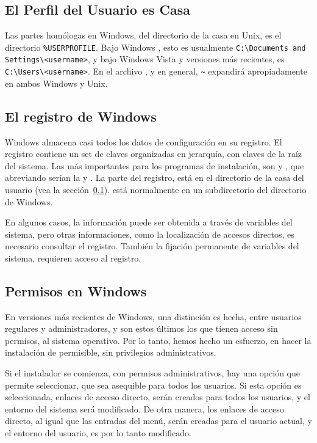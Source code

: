 \documentclass{article}
\begin{document}
\subsection{El Perfil del Usuario es Casa}
\label{sec:winhome}

Las partes homólogas en Windows, del directorio de la casa en Unix, es el
directorio \verb|%USERPROFILE|. Bajo Windows , esto es usualmente
\verb|C:\Documents and Settings\<username>|, y bajo Windows Vista y
versiones más recientes, es \verb|C:\Users\<username>|. En el archivo
, y \KPS{} en general, \verb|~| expandirá
apropiadamente en ambos Windows y Unix. 

\subsection{El registro de Windows}
\label{sec:registry}

Windows almacena casi todos los datos de configuración en su registro. El
registro contiene un set de claves organizadas en jerarquía, con claves de
la raíz del sistema. Las más importantes para los programas de
instalación, son  y , que
abreviando serían la  y . La parte  del
registro, está en el directorio de la casa del usuario (vea la
sección~\ref{sec:winhome}).  está normalmente en un
subdirectorio del directorio de Windows.

En algunos casos, la información puede ser obtenida a través de variables
del sistema, pero otras informaciones, como la localización de accesos
directos, es necesario consultar el registro. También la fijación
permanente de variables del sistema, requieren acceso al registro.

\subsection{Permisos en Windows}
\label{sec:winpermissions}

En versiones más recientes de Windows, una distinción es hecha, entre
usuarios regulares y administradores, y son estos últimos los que tienen
acceso sin permisos, al sistema operativo. Por lo tanto, hemos hecho un
esfuerzo, en hacer la instalación de \TL{} permisible, sin privilegios
administrativos. 

Si el instalador se comienza, con permisos administrativos, hay una
opción que permite seleccionar, que sea asequible para todos los usuarios. Si esta
opción es seleccionada, enlaces de acceso directo, serán creados para
todos los usuarios, y el entorno del sistema será modificado. De otra
manera, los enlaces de acceso directo, al igual que las entradas del menú,
serán creadas para el usuario actual, y el entorno del usuario, es por lo
tanto modificado. 
\end{document}
